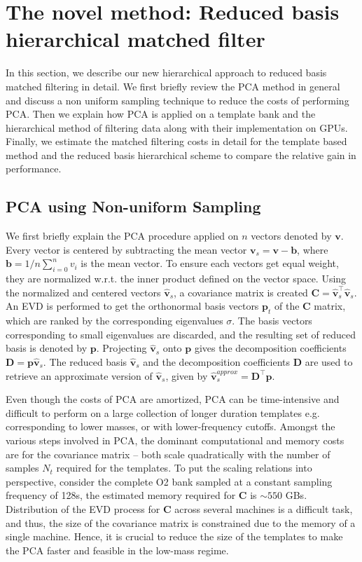 \section{The novel method: Reduced basis hierarchical matched filter}
In this section, we describe our new hierarchical approach to reduced basis matched filtering in detail. We first briefly review the PCA method in general and discuss a non uniform sampling technique to reduce the costs of performing PCA. Then we explain how PCA is applied on a template bank and the hierarchical method of filtering data along with their implementation on GPUs. Finally, we estimate the matched filtering costs in detail for the template based method and the reduced basis hierarchical scheme to compare the relative gain in performance.     

\subsection{PCA using Non-uniform Sampling}

We first briefly explain the PCA procedure applied on $n$ vectors denoted by $\textbf{v}$. Every vector is centered by subtracting the mean vector $\textbf{v}_s = \textbf{v} - \textbf{b}$, where $\textbf{b} = 1/n\sum_{i=0}^{n} v_i$ is the mean vector. To ensure each vectors get equal weight, they are normalized w.r.t. the inner product defined on the vector space. Using the normalized and centered vectors $\hat{\textbf{v}}_s$, a covariance matrix is created $\textbf{C} = \hat{\textbf{v}}_s^{\top}\hat{\textbf{v}}_s$. An EVD is performed to get the orthonormal basis vectors $\textbf{p}_t$ of the $\textbf{C}$ matrix, which are ranked by the corresponding eigenvalues $\sigma$. The basis vectors corresponding to small eigenvalues are discarded, and the resulting set of reduced basis is denoted by $\textbf{p}$.  Projecting $\hat{\textbf{v}}_s$ onto $\textbf{p}$ gives the decomposition coefficients $\textbf{D} = \textbf{p}\hat{\textbf{v}}_s$. The reduced basis $\hat{\textbf{v}}_s$ and the decomposition coefficients $\textbf{D}$ are used to retrieve an approximate version of $\hat{\textbf{v}}_s$, given by $\hat{\textbf{v}}_s^{approx} = \textbf{D}^{\top}\textbf{p}$. 

Even though the costs of PCA are amortized, PCA can be time-intensive and difficult to perform on a large collection of longer duration templates e.g. corresponding to lower masses, or with lower-frequency cutoffs. Amongst the various steps involved in PCA, the dominant computational and memory costs are for the covariance matrix -- both scale quadratically with the number of samples $N_t$ required for the templates. To put the scaling relations into perspective, consider the complete O2 bank sampled at a constant sampling frequency of 128s, the estimated memory required for $\textbf{C}$ is $\sim 550$ GBs. Distribution of the EVD process for $\textbf{C}$ across several machines is a difficult task, and thus, the size of the covariance matrix is constrained due to the memory of a single machine. Hence, it is crucial to reduce the size of the templates to make the PCA faster and feasible in the low-mass regime.

